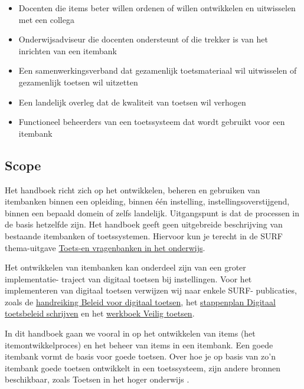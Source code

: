 \documentclass[
]{book}
\providecommand{\tightlist}{%
  \setlength{\itemsep}{0pt}\setlength{\parskip}{0pt}}
\begin{document}
\begin{itemize}
\tightlist
\item
  Docenten die items beter willen ordenen of willen ontwikkelen en uitwisselen met een collega
\item
  Onderwijsadviseur die docenten ondersteunt of die trekker is van het inrichten van een itembank
\item
  Een samenwerkingsverband dat gezamenlijk toetsmateriaal wil uitwisselen of gezamenlijk toetsen wil uitzetten
\item
  Een landelijk overleg dat de kwaliteit van toetsen wil verhogen
\item
  Functioneel beheerders van een toetssysteem dat wordt gebruikt voor een itembank
\end{itemize}

\hypertarget{scope}{%
\subsection{Scope}\label{scope}}

Het handboek richt zich op het ontwikkelen, beheren en gebruiken van itembanken binnen een opleiding, binnen één instelling, instellingsoverstijgend, binnen een bepaald domein of zelfs landelijk. Uitgangspunt is dat de processen in de basis hetzelfde zijn. Het handboek geeft geen uitgebreide beschrijving van bestaande itembanken of toetssystemen. Hiervoor kun je terecht in de SURF thema-uitgave \href{https://www.surf.nl/thema-uitgave-toets-en-vragenbanken-in-het-onderwijs}{Toets-en vragenbanken in het onderwijs}.

Het ontwikkelen van itembanken kan onderdeel zijn van een groter implementatie- traject van digitaal toetsen bij instellingen. Voor het implementeren van digitaal toetsen verwijzen wij naar enkele SURF- publicaties, zoals de \href{https://www.surf.nl/kennisbank/2016/handreiking-beleid-voor-digitaal-toetsen.html}{handreiking Beleid voor digitaal toetsen}, het \href{https://www.surf.nl/kennisbank/2016/stappenplan-digitaaltoetsbeleid-schrijven.html}{stappenplan Digitaal toetsbeleid schrijven} en het \href{https://www.surf.nl/kennisbank/2016/werkboek-veilig-toetsen.html}{werkboek Veilig toetsen}.

In dit handboek gaan we vooral in op het ontwikkelen van items (het itemontwikkelproces) en het beheer van items in een itembank. Een goede itembank vormt de basis voor goede toetsen. Over hoe je op basis van zo'n itembank goede toetsen ontwikkelt in een toetssysteem, zijn andere bronnen beschikbaar, zoals Toetsen in het hoger onderwijs \citet{van2017toetsen}.
\end{document}
